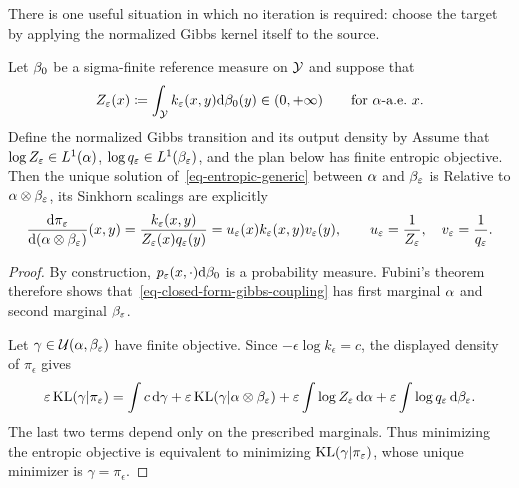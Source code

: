 There is one useful situation in which no iteration is required: choose the target by applying the normalized Gibbs kernel itself to the source.

\begin{prop}\label{prop-sinkhorn-gibbs-pushforward}
Let $\beta_0$ be a sigma-finite reference measure on $\mathcal{Y}$ and suppose that
\[
	Z_\varepsilon(x)\coloneqq\int_{\mathcal{Y}} k_\varepsilon(x,y)\mathrm{d}\beta_0(y)
	\in(0,+\infty)
	\qquad\text{for $\alpha$-a.e.\ }x.
\]
Define the normalized Gibbs transition and its output density by
Assume that $\log Z_\varepsilon\in L^1(\alpha)$, $\log q_\varepsilon\in L^1(\beta_\varepsilon)$, and the plan below has finite entropic objective. Then the unique solution of~\eqref{eq-entropic-generic} between $\alpha$ and $\beta_\varepsilon$ is
Relative to $\alpha\otimes\beta_\varepsilon$, its Sinkhorn scalings are explicitly
\[
	\frac{\mathrm{d}\pi_\varepsilon}{\mathrm{d}(\alpha\otimes\beta_\varepsilon)}(x,y)
	=
	\frac{k_\varepsilon(x,y)}{Z_\varepsilon(x)q_\varepsilon(y)}
	=
	u_\varepsilon(x)k_\varepsilon(x,y)v_\varepsilon(y),
	\qquad
	u_\varepsilon=\frac1{Z_\varepsilon},
	\quad
	v_\varepsilon=\frac1{q_\varepsilon}.
\]
\end{prop}

\begin{proof}
By construction, $p_\varepsilon(x,\cdot)\mathrm{d}\beta_0$ is a probability measure. Fubini's theorem therefore shows that~\eqref{eq-closed-form-gibbs-coupling} has first marginal $\alpha$ and second marginal $\beta_\varepsilon$.

Let $\gamma\in\mathcal{U}(\alpha,\beta_\varepsilon)$ have finite objective. Since $-\epsilon\log k_\epsilon=c$, the displayed density of $\pi_\epsilon$ gives
\[
	\varepsilon\operatorname{KL}(\gamma|\pi_\varepsilon)
	=
	\int c\,\mathrm{d}\gamma
	+\varepsilon\operatorname{KL}(\gamma|\alpha\otimes\beta_\varepsilon)
	+\varepsilon\int\log Z_\varepsilon\,\mathrm{d}\alpha
	+\varepsilon\int\log q_\varepsilon\,\mathrm{d}\beta_\varepsilon.
\]
The last two terms depend only on the prescribed marginals. Thus minimizing the entropic objective is equivalent to minimizing $\operatorname{KL}(\gamma|\pi_\varepsilon)$, whose unique minimizer is $\gamma=\pi_\epsilon$.
\end{proof}

